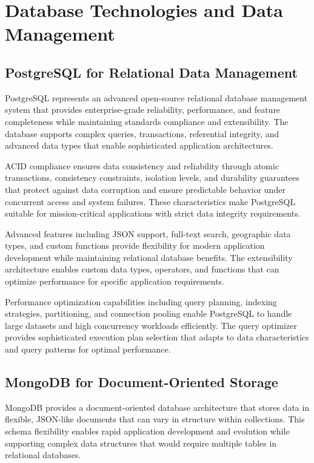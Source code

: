 \section{Database Technologies and Data Management}

\subsection{PostgreSQL for Relational Data Management}

PostgreSQL represents an advanced open-source relational database management system that provides enterprise-grade reliability, performance, and feature completeness while maintaining standards compliance and extensibility. The database supports complex queries, transactions, referential integrity, and advanced data types that enable sophisticated application architectures.

ACID compliance ensures data consistency and reliability through atomic transactions, consistency constraints, isolation levels, and durability guarantees that protect against data corruption and ensure predictable behavior under concurrent access and system failures. These characteristics make PostgreSQL suitable for mission-critical applications with strict data integrity requirements.

Advanced features including JSON support, full-text search, geographic data types, and custom functions provide flexibility for modern application development while maintaining relational database benefits. The extensibility architecture enables custom data types, operators, and functions that can optimize performance for specific application requirements.

Performance optimization capabilities including query planning, indexing strategies, partitioning, and connection pooling enable PostgreSQL to handle large datasets and high concurrency workloads efficiently. The query optimizer provides sophisticated execution plan selection that adapts to data characteristics and query patterns for optimal performance.

\subsection{MongoDB for Document-Oriented Storage}

MongoDB provides a document-oriented database architecture that stores data in flexible, JSON-like documents that can vary in structure within collections. This schema flexibility enables rapid application development and evolution while supporting complex data structures that would require multiple tables in relational databases.

